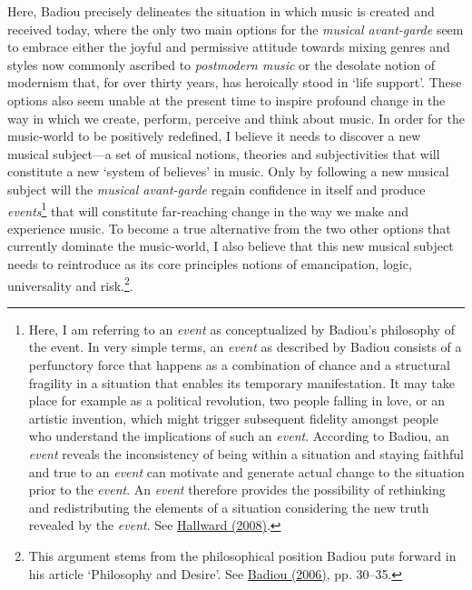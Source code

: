 Here, Badiou precisely delineates the situation in which music is created and received today, where the only two main options for the \emph{musical avant-garde} seem to embrace either the joyful and permissive attitude towards mixing genres and styles now commonly ascribed to \emph{postmodern music} or the desolate notion of modernism that, for over thirty years, has heroically stood in `life support'. These options also seem unable at the present time to inspire profound change in the way in which we create, perform, perceive and think about music. In order for the music-world to be positively redefined, I believe it needs to discover a new musical subject---a set of musical notions, theories and subjectivities that will constitute a new `system of believes' in music. Only by following a new musical subject will the \emph{musical avant-garde} regain confidence in itself and produce \emph{events}\footnote{Here, I am referring to an \emph{event} as conceptualized by  Badiou's philosophy of the event. In very simple terms, an \emph{event} as described by Badiou consists of a perfunctory force that happens as a combination of chance and a structural fragility in a situation that enables its temporary manifestation. It may take place for example as a political revolution, two people falling in love, or an artistic invention, which might trigger subsequent fidelity amongst people who understand the implications of such an \emph{event}. According to Badiou, an \emph{event} reveals the inconsistency of being within a situation and staying faithful and true to an \emph{event} can motivate and generate actual change to the situation prior to the \emph{event}. An \emph{event} therefore provides the possibility of rethinking and redistributing the elements of a situation considering the new truth revealed by the \emph{event}. See \hyperlink{hallward}{Hallward (2008)}.} that will constitute far-reaching change in the way we make and experience music. To become a true alternative from the two other options that currently dominate the music-world, I also believe that this new musical subject needs to reintroduce as its core principles notions of emancipation, logic, universality and risk.\footnote{This argument stems from the philosophical position Badiou puts forward in his article `Philosophy and Desire'. See \hyperlink{infthought}{Badiou (2006)}, pp. 30--35.}.

